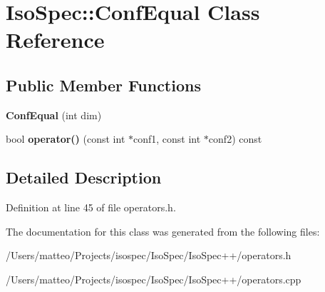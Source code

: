 \hypertarget{class_iso_spec_1_1_conf_equal}{}\section{Iso\+Spec\+:\+:Conf\+Equal Class Reference}
\label{class_iso_spec_1_1_conf_equal}
\subsection*{Public Member Functions}
\begin{DoxyCompactItemize}
\item 
\mbox{\label{class_iso_spec_1_1_conf_equal_a1e64267307db788516b6dfc98614d4a8}} 
{\bfseries Conf\+Equal} (int dim)
\item 
\mbox{\label{class_iso_spec_1_1_conf_equal_a3efc7320ba25aa916b98066d387890e0}} 
bool {\bfseries operator()} (const int $\ast$conf1, const int $\ast$conf2) const
\end{DoxyCompactItemize}


\subsection{Detailed Description}


Definition at line 45 of file operators.\+h.



The documentation for this class was generated from the following files\+:\begin{DoxyCompactItemize}
\item 
/\+Users/matteo/\+Projects/isospec/\+Iso\+Spec/\+Iso\+Spec++/operators.\+h\item 
/\+Users/matteo/\+Projects/isospec/\+Iso\+Spec/\+Iso\+Spec++/operators.\+cpp\end{DoxyCompactItemize}
